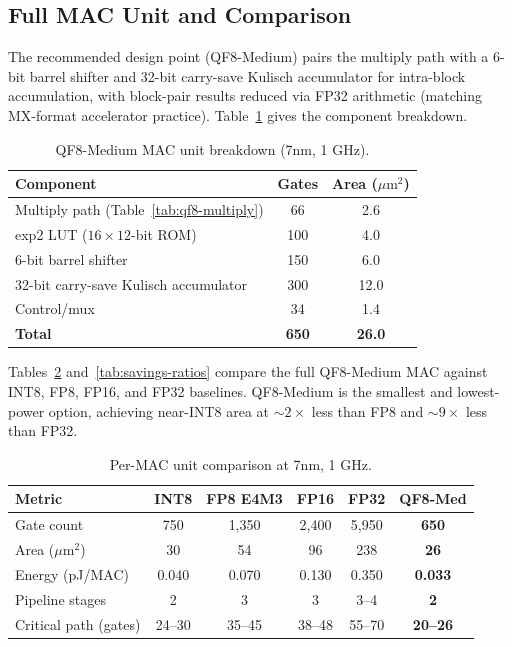 \documentclass[11pt,letterpaper]{article}
\theoremstyle{definition}
\theoremstyle{remark}
\begin{document}
\subsection{Full MAC Unit and Comparison}

The recommended design point (QF8-Medium) pairs the multiply path with a
6-bit barrel shifter and 32-bit carry-save Kulisch accumulator for intra-block
accumulation, with block-pair results reduced via FP32 arithmetic (matching
MX-format accelerator practice).
Table~\ref{tab:qf8-medium} gives the component breakdown.

\begin{table}[ht!]
\centering
\caption{QF8-Medium MAC unit breakdown (7nm, 1 GHz).}
\label{tab:qf8-medium}
\begin{tabular}{@{}lcc@{}}
\toprule
Component & Gates & Area ($\mu\text{m}^2$) \\
\midrule
Multiply path (Table~\ref{tab:qf8-multiply})& 66   & 2.6  \\
exp2 LUT ($16 \times 12$-bit ROM)        & 100  & 4.0  \\
6-bit barrel shifter                     & 150  & 6.0  \\
32-bit carry-save Kulisch accumulator    & 300  & 12.0 \\
Control/mux                              & 34   & 1.4  \\
\midrule
\textbf{Total}                           & \textbf{650} & \textbf{26.0} \\
\bottomrule
\end{tabular}
\end{table}

Tables~\ref{tab:master-comparison} and~\ref{tab:savings-ratios} compare the
full QF8-Medium MAC against INT8, FP8, FP16, and FP32 baselines.
QF8-Medium is the smallest and lowest-power option, achieving near-INT8 area
at ${\sim}2\times$ less than FP8 and ${\sim}9\times$ less than FP32.

\begin{table}[ht!]
\centering
\caption{Per-MAC unit comparison at 7nm, 1 GHz.}
\label{tab:master-comparison}
\begin{tabular}{@{}lccccc@{}}
\toprule
Metric & INT8 & FP8 E4M3 & FP16 & FP32 & \textbf{QF8-Med} \\
\midrule
Gate count      & 750 & 1,350 & 2,400 & 5,950 & \textbf{650}  \\
Area ($\mu\text{m}^2$) & 30 & 54 & 96 & 238 & \textbf{26}   \\
Energy (pJ/MAC) & 0.040 & 0.070 & 0.130 & 0.350 & \textbf{0.033}\\
Pipeline stages & 2  & 3     & 3     & 3--4  & \textbf{2}    \\
Critical path (gates) & 24--30 & 35--45 & 38--48 & 55--70 & \textbf{20--26}\\
\bottomrule
\end{tabular}
\end{table}
\end{document}
